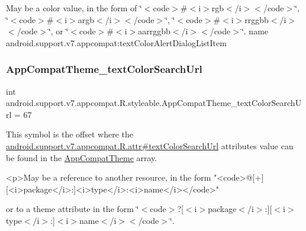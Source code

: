 May be a color value, in the form of \char`\"{}$<$code$>$\#$<$i$>$rgb$<$/i$>$$<$/code$>$\char`\"{}, \char`\"{}$<$code$>$\#$<$i$>$argb$<$/i$>$$<$/code$>$\char`\"{}, \char`\"{}$<$code$>$\#$<$i$>$rrggbb$<$/i$>$$<$/code$>$\char`\"{}, or \char`\"{}$<$code$>$\#$<$i$>$aarrggbb$<$/i$>$$<$/code$>$\char`\"{}.  name android.\+support.\+v7.\+appcompat\+:text\+Color\+Alert\+Dialog\+List\+Item \mbox{\label{classandroid_1_1support_1_1v7_1_1appcompat_1_1R_1_1styleable_a2b9490f156d0cba539dc09a7aa3883e5}} 
\subsubsection{\texorpdfstring{App\+Compat\+Theme\+\_\+text\+Color\+Search\+Url}{AppCompatTheme\_textColorSearchUrl}}
{\footnotesize\ttfamily int android.\+support.\+v7.\+appcompat.\+R.\+styleable.\+App\+Compat\+Theme\+\_\+text\+Color\+Search\+Url = 67\hspace{0.3cm}{\ttfamily [static]}}

This symbol is the offset where the \hyperlink{classandroid_1_1support_1_1v7_1_1appcompat_1_1R_1_1attr_a05d18409c9b5b41fbde88ff790d081d2}{android.\+support.\+v7.\+appcompat.\+R.\+attr\#text\+Color\+Search\+Url} attribute\textquotesingle{}s value can be found in the \hyperlink{classandroid_1_1support_1_1v7_1_1appcompat_1_1R_1_1styleable_a5c42f89e8a410c323be34208d75c430b}{App\+Compat\+Theme} array.

\begin{DoxyVerb}      <p>May be a reference to another resource, in the form "<code>@[+][<i>package</i>:]<i>type</i>:<i>name</i></code>"
\end{DoxyVerb}
 or to a theme attribute in the form \char`\"{}$<$code$>$?\mbox{[}$<$i$>$package$<$/i$>$\+:\mbox{]}\mbox{[}$<$i$>$type$<$/i$>$\+:\mbox{]}$<$i$>$name$<$/i$>$$<$/code$>$\char`\"{}. 

